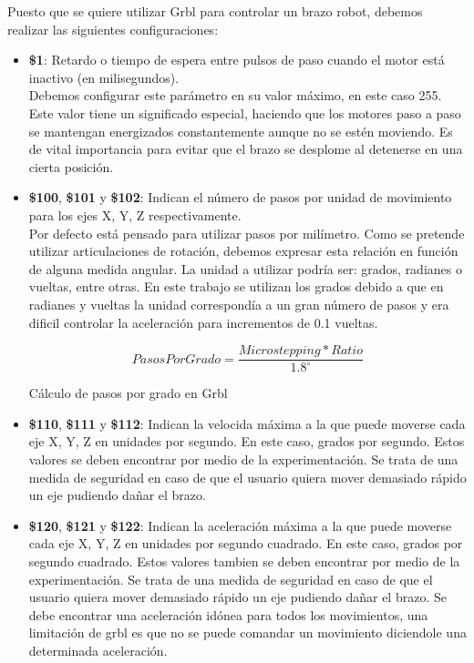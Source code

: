 Puesto que se quiere utilizar Grbl para controlar un brazo robot, debemos 
realizar las siguientes configuraciones:
\begin{itemize}
\item \textbf{\$1}: Retardo o tiempo de espera entre pulsos de paso cuando el motor está inactivo (en milisegundos). 
\\Debemos configurar 
este parámetro en su valor máximo, en este caso 255. Este valor tiene un significado especial, haciendo que los motores paso a paso 
se mantengan energizados constantemente aunque no se estén moviendo. Es de vital importancia para evitar que el brazo se desplome al detenerse en una cierta posición.  
\item \textbf{\$100}, \textbf{\$101} y \textbf{\$102}: Indican el número de pasos por unidad de movimiento para los ejes X, Y, Z respectivamente. 
\\Por defecto está pensado para utilizar pasos por milímetro. Como se pretende utilizar articulaciones de rotación, debemos expresar esta relación 
en función de alguna medida angular. La unidad a utilizar podría ser: grados, radianes o vueltas, entre otras. En este trabajo se 
utilizan los grados debido a que en radianes y vueltas la unidad correspondía a un gran número de pasos y era dificil controlar la aceleración para incrementos de 
0.1 vueltas. 

\begin{myequation}[h!]
\begin{equation}
    PasosPorGrado = \frac{Microstepping * Ratio}{1.8^\circ}
\nonumber
\label{ec:pasos_por_grado}
\end{equation}
\caption[Cálculo de pasos por grado en Grbl]{Cálculo de pasos por grado en Grbl}
\end{myequation} 

\item \textbf{\$110}, \textbf{\$111} y \textbf{\$112}: Indican la velocida máxima a la que puede moverse cada eje X, Y, Z en unidades por segundo. 
En este caso, grados por segundo. Estos valores se deben encontrar por medio de la experimentación. Se trata de una medida de seguridad en 
caso de que el usuario quiera mover demasiado rápido un eje pudiendo dañar el brazo.

\item \textbf{\$120}, \textbf{\$121} y \textbf{\$122}: Indican la aceleración máxima a la que puede moverse cada eje X, Y, Z en unidades por segundo cuadrado. 
En este caso, grados por segundo cuadrado. Estos valores tambien se deben encontrar por medio de la experimentación. Se trata de una medida de seguridad en 
caso de que el usuario quiera mover demasiado rápido un eje pudiendo dañar el brazo. Se debe encontrar una aceleración idónea para todos 
los movimientos, una limitación de grbl es que no se puede comandar un movimiento diciendole una determinada aceleración.
\end{itemize}

